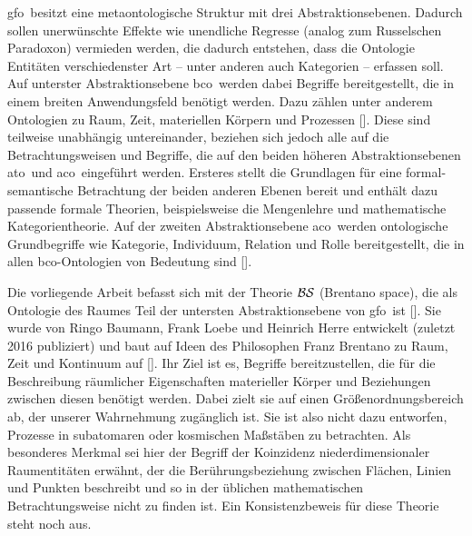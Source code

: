     \ac{gfo}\ besitzt
    eine metaontologische Struktur mit drei Abstraktionsebenen. 
    Dadurch sollen unerwünschte Effekte wie unendliche Regresse (analog zum Russelschen Paradoxon) vermieden werden, die dadurch entstehen, dass die Ontologie Entitäten verschiedenster Art -- unter anderen auch Kategorien -- erfassen soll.
    Auf unterster Abstraktionsebene \ac{bco}\ werden dabei Begriffe bereitgestellt, die in einem breiten Anwendungsfeld benötigt werden.
    Dazu zählen unter anderem Ontologien zu Raum, Zeit, materiellen Körpern und Prozessen
    [\cite{baumann-r-2014-171-a, baumann-r-2016-53-a}].
    Diese sind teilweise unabhängig untereinander, beziehen sich jedoch alle auf die Betrachtungsweisen und Begriffe, die auf den beiden höheren Abstraktionsebenen  \ac{ato}\ und \ac{aco}\ eingeführt werden.
    Ersteres stellt die Grundlagen für eine formal-semantische Betrachtung der beiden anderen Ebenen bereit und enthält dazu passende formale Theorien, beispielsweise die Mengenlehre und mathematische Kategorientheorie.
    Auf der zweiten Abstraktionsebene \ac{aco}\ werden ontologische Grundbegriffe wie Kategorie, Individuum, Relation und Rolle bereitgestellt, die in allen \ac{bco}-Ontologien von Bedeutung sind
    [\cite{loebe-f-2018--a}].

    Die
    vorliegende Arbeit befasst sich mit der Theorie $\mathcal{BS}$ (Brentano space), die als Ontologie des Raumes Teil der untersten Abstraktionsebene von \ac{gfo}\ ist [\cite{baumann-r-2016-53-a}].
    Sie wurde von Ringo Baumann, Frank Loebe und Heinrich Herre entwickelt (zuletzt 2016 publiziert) und baut auf Ideen des Philosophen Franz Brentano zu Raum, Zeit und Kontinuum auf [\cite{brentano-f-1976--a}].
    Ihr Ziel ist es, Begriffe bereitzustellen, die für die Beschreibung räumlicher Eigenschaften materieller Körper und Beziehungen zwischen diesen benötigt werden.
    Dabei zielt sie auf einen Größenordnungsbereich ab, der unserer Wahrnehmung zugänglich ist.
    Sie ist also nicht dazu entworfen, Prozesse in subatomaren oder kosmischen Maßstäben zu betrachten.
    Als besonderes Merkmal sei hier der Begriff der Koinzidenz niederdimensionaler Raumentitäten erwähnt, der die Berührungsbeziehung zwischen Flächen, Linien und Punkten beschreibt und so in der üblichen mathematischen Betrachtungsweise nicht zu finden ist.
    Ein Konsistenzbeweis für diese Theorie steht noch aus.
    

